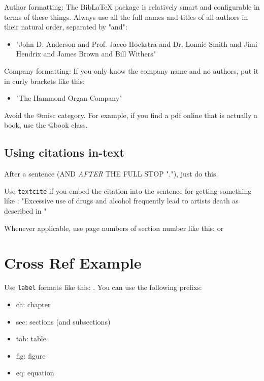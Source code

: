 Author formatting: The BibLaTeX package is relatively smart and configurable in terms of these things. Always use all the full names and titles of all authors in their natural order, separated by "and":
\begin{itemize}
    \item "John D. Anderson and Prof. Jacco Hoekstra and Dr. Lonnie Smith and Jimi Hendrix and James Brown and Bill Withers"
\end{itemize}

Company formatting: If you only know the company name and no authors, put it in curly brackets like this: 
\begin{itemize}
    \item "{The Hammond Organ Company}"
\end{itemize}

Avoid the @misc category. For example, if you find a pdf online that is actually a book, use the @book class.



\section{Using citations in-text}

After a sentence (AND \emph{AFTER} THE FULL STOP "."), just do this. \autocite{hendrix70}

Use \texttt{textcite} if you embed the citation into the sentence for getting something like : "Excessive use of drugs and alcohol frequently lead to artists death as described in \textcite{hendrix70}"

Whenever applicable, use page numbers of section number like this: \autocite[p.42-70]{hendrix70} or \autocite[Section "3rd Stone From The Sun"]{hendrix70}





\chapter{Cross Ref Example}

Use \texttt{label} formats like this: \label{ch:CrossRef}. You can use the following prefixs:
\begin{itemize}
    \item ch: chapter
    \item sec: sections (and subsections)
    \item tab: table
    \item fig: figure
    \item eq: equation
\end{itemize}


